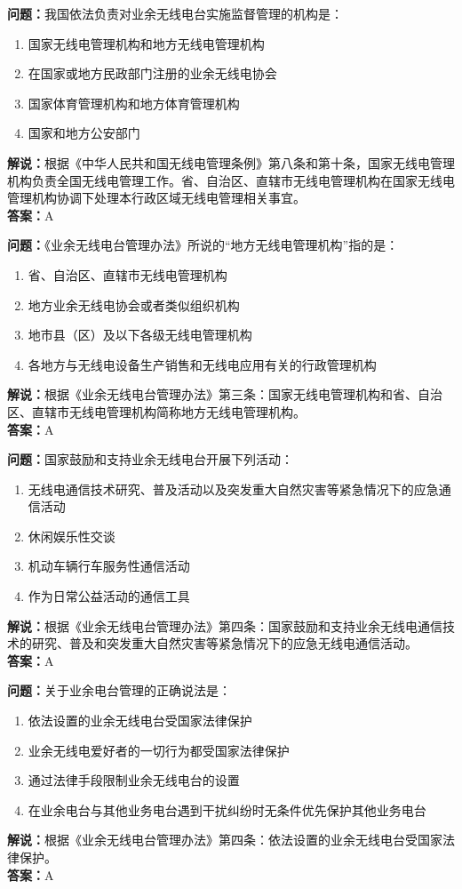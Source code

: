 \documentclass{ctexbook}%
\begin{document}
\textbf{问题：}我国依法负责对业余无线电台实施监督管理的机构是：
\begin{enumerate}[label=\Alph*), leftmargin=3em]
\item 国家无线电管理机构和地方无线电管理机构
\item 在国家或地方民政部门注册的业余无线电协会
\item 国家体育管理机构和地方体育管理机构
\item 国家和地方公安部门
\end{enumerate}
\textbf{解说：}根据《中华人民共和国无线电管理条例》第八条和第十条，国家无线电管理机构负责全国无线电管理工作。省、自治区、直辖市无线电管理机构在国家无线电管理机构协调下处理本行政区域无线电管理相关事宜。\\
\textbf{答案：}A

\textbf{问题：}《业余无线电台管理办法》所说的“地方无线电管理机构”指的是：
\begin{enumerate}[label=\Alph*), leftmargin=3em]
\item 省、自治区、直辖市无线电管理机构
\item 地方业余无线电协会或者类似组织机构
\item 地市县（区）及以下各级无线电管理机构
\item 各地方与无线电设备生产销售和无线电应用有关的行政管理机构
\end{enumerate}
\textbf{解说：}根据《业余无线电台管理办法》第三条：国家无线电管理机构和省、自治区、直辖市无线电管理机构简称地方无线电管理机构。\\
\textbf{答案：}A

\textbf{问题：}国家鼓励和支持业余无线电台开展下列活动：
\begin{enumerate}[label=\Alph*), leftmargin=3em]
\item 无线电通信技术研究、普及活动以及突发重大自然灾害等紧急情况下的应急通信活动
\item 休闲娱乐性交谈
\item 机动车辆行车服务性通信活动
\item 作为日常公益活动的通信工具
\end{enumerate}
\textbf{解说：}根据《业余无线电台管理办法》第四条：国家鼓励和支持业余无线电通信技术的研究、普及和突发重大自然灾害等紧急情况下的应急无线电通信活动。\\
\textbf{答案：}A

\textbf{问题：}关于业余电台管理的正确说法是：
\begin{enumerate}[label=\Alph*), leftmargin=3em]
\item 依法设置的业余无线电台受国家法律保护
\item 业余无线电爱好者的一切行为都受国家法律保护
\item 通过法律手段限制业余无线电台的设置
\item 在业余电台与其他业务电台遇到干扰纠纷时无条件优先保护其他业务电台
\end{enumerate}
\textbf{解说：}根据《业余无线电台管理办法》第四条：依法设置的业余无线电台受国家法律保护。\\
\textbf{答案：}A
\end{document}

